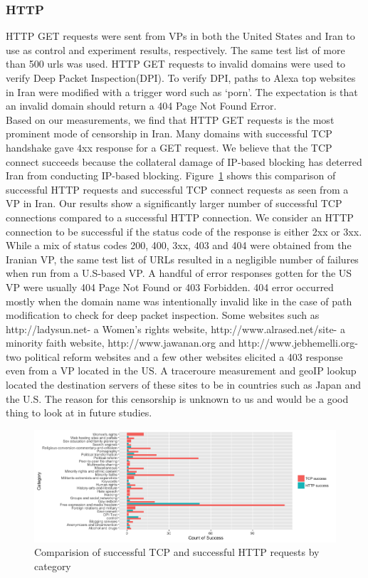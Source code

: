\subsubsection{HTTP}
 HTTP GET requests were sent from VPs  in both the United States and Iran to use as control and experiment results, respectively. The same test list of more than 500 urls was used. HTTP GET requests to invalid domains were used to verify Deep Packet Inspection(DPI). To verify DPI, paths to Alexa top websites in Iran were modified with a trigger word such as `porn'. The expectation is that an invalid domain should return a 404 Page Not Found Error.\\
Based on our measurements, we find that HTTP GET requests is the most prominent mode of censorship in Iran. Many domains with successful TCP handshake gave 4xx response for a GET request. We believe that  the TCP connect succeeds because the collateral damage of IP-based blocking has deterred Iran from conducting IP-based blocking. Figure~\ref{fig:TCPcomapreHTTP} shows this comparison of successful HTTP  requests and successful TCP connect requests as seen from a VP in Iran. Our  results show a significantly larger number of successful TCP connections compared to a successful HTTP connection.  We consider an HTTP connection to be successful if the status code of the response is either 2xx or 3xx.\\
While a mix of status codes 200, 400, 3xx, 403 and 404 were obtained from the Iranian VP, the same test list of URLs resulted in a negligible number of failures when run from a U.S-based VP.  A handful of error responses gotten for the US VP were usually  404 Page Not Found or 403 Forbidden. 404 error occurred mostly when the domain name was intentionally invalid like in the case of path modification to check for deep packet inspection. Some websites such as http://ladysun.net- a Women's rights website, http://www.alrased.net/site- a minority faith website, http://www.jawanan.org and http://www.jebhemelli.org- two political reform websites and a few other websites elicited a 403 response even from a VP located in the US. A traceroure measurement and geoIP lookup located the destination servers of these sites to be in countries such as Japan and the U.S. The reason for this censorship is unknown to us and would be a good thing to look at in future studies.\\
\begin{figure}
 \centerline{\includegraphics[width=.9\textwidth,keepaspectratio]{pictures/TCPcompareHTTP.png}}
  \caption{Comparision of successful TCP and successful HTTP requests by category}
  \label{fig:TCPcomapreHTTP}
\end{figure}
